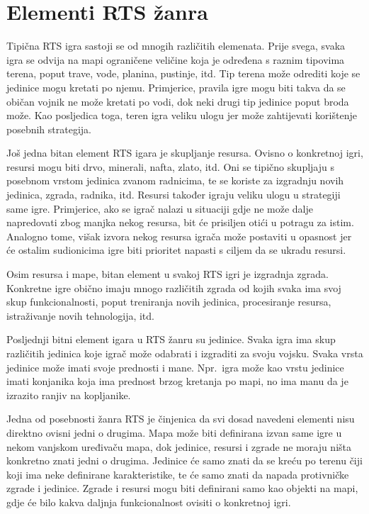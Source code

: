\documentclass[times, utf8, zavrsni, numeric]{fer}
\begin{document}

\section{Elementi RTS žanra}

\par Tipična RTS igra sastoji se od mnogih različitih elemenata.
Prije svega, svaka igra se odvija na mapi ograničene veličine koja je određena s raznim tipovima terena, poput trave, vode, planina, pustinje, itd. 
Tip terena može odrediti koje se jedinice mogu kretati po njemu.
Primjerice, pravila igre mogu biti takva da se običan vojnik ne može kretati po vodi, dok neki drugi tip jedinice poput broda može.
Kao posljedica toga, teren igra veliku ulogu jer može zahtijevati korištenje posebnih strategija.

\par Još jedna bitan element RTS igara je skupljanje resursa.
Ovisno o konkretnoj igri, resursi mogu biti drvo, minerali, nafta, zlato, itd. Oni se tipično skupljaju s posebnom vrstom jedinica zvanom radnicima, te se koriste za izgradnju novih jedinica, zgrada, radnika, itd.
Resursi također igraju veliku ulogu u strategiji same igre.
Primjerice, ako se igrač nalazi u situaciji gdje ne može dalje napredovati zbog manjka nekog resursa, bit će prisiljen otići u potragu za istim.
Analogno tome, višak izvora nekog resursa igrača može postaviti u opasnost jer će ostalim sudionicima igre biti prioritet napasti s ciljem da se ukradu resursi.

\par Osim resursa i mape, bitan element u svakoj RTS igri je izgradnja zgrada. 
Konkretne igre obično imaju mnogo različitih zgrada od kojih svaka ima svoj skup funkcionalnosti, poput treniranja novih jedinica, procesiranje resursa, istraživanje novih tehnologija, itd.  

\par Posljednji bitni element igara u RTS žanru su jedinice. 
Svaka igra ima skup različitih jedinica koje igrač može odabrati i izgraditi za svoju vojsku.
Svaka vrsta jedinice može imati svoje prednosti i mane.
Npr.\ igra može kao vrstu jedinice imati konjanika koja ima prednost brzog kretanja po mapi, no ima manu da je izrazito ranjiv na kopljanike.

\par Jedna od posebnosti žanra RTS je činjenica da svi dosad navedeni elementi nisu direktno ovisni jedni o drugima.
Mapa može biti definirana izvan same igre u nekom vanjskom uređivaču mapa, dok jedinice, resursi i zgrade ne moraju ništa konkretno znati jedni o drugima.
Jedinice će samo znati da se kreću po terenu čiji koji ima neke definirane karakteristike, te će samo znati da napada protivničke zgrade i jedinice. 
Zgrade i resursi mogu biti definirani samo kao objekti na mapi, gdje će bilo kakva daljnja funkcionalnost ovisiti o konkretnoj igri.
\end{document}

